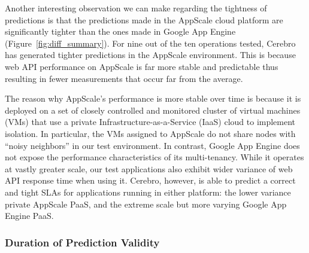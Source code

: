 Another interesting observation we can make regarding the tightness of
predictions is that the predictions made in the AppScale cloud platform are
significantly tighter than the ones made in Google App Engine
(Figure~\ref{fig:diff_summary}). 
For nine out of the ten operations tested, Cerebro has generated tighter
predictions in the AppScale environment. This is because web API performance
on AppScale is far more stable and predictable thus resulting in fewer
measurements that occur far from the average.

The reason why AppScale's performance is more stable over time is because it is
deployed on a set of closely controlled 
and monitored cluster of virtual machines (VMs) that use a private
Infrastructure-as-a-Service (IaaS) cloud to implement isolation.  In particular, the 
VMs assigned to AppScale do not share nodes with ``noisy neighbors'' in our
test environment.  In contrast, Google App Engine does not expose the
performance characteristics of its multi-tenancy.  While it operates at vastly
greater scale, our test applications also exhibit wider variance of web API
response time when using it.
Cerebro, however, is able to predict a correct and tight SLAs for applications
running in either platform: the lower variance private
AppScale PaaS, and the extreme scale but more varying Google App Engine PaaS.

\subsubsection{Duration of Prediction Validity}

